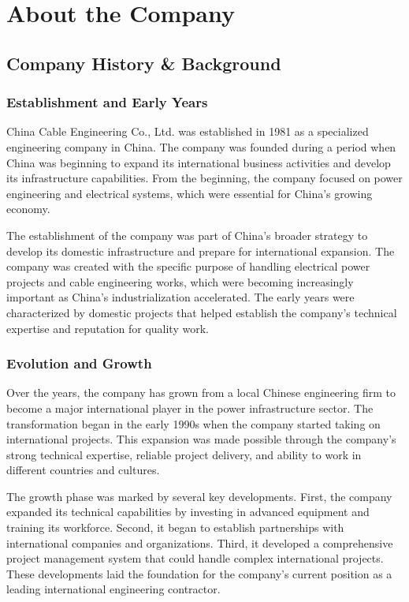 
\chapter{About the Company}

\section{Company History \& Background}

\subsection{Establishment and Early Years}
China Cable Engineering Co., Ltd. was established in 1981 as a specialized engineering company in China. The company was founded during a period when China was beginning to expand its international business activities and develop its infrastructure capabilities. From the beginning, the company focused on power engineering and electrical systems, which were essential for China's growing economy.

The establishment of the company was part of China's broader strategy to develop its domestic infrastructure and prepare for international expansion. The company was created with the specific purpose of handling electrical power projects and cable engineering works, which were becoming increasingly important as China's industrialization accelerated. The early years were characterized by domestic projects that helped establish the company's technical expertise and reputation for quality work.

\subsection{Evolution and Growth}
Over the years, the company has grown from a local Chinese engineering firm to become a major international player in the power infrastructure sector. The transformation began in the early 1990s when the company started taking on international projects. This expansion was made possible through the company's strong technical expertise, reliable project delivery, and ability to work in different countries and cultures.

The growth phase was marked by several key developments. First, the company expanded its technical capabilities by investing in advanced equipment and training its workforce. Second, it began to establish partnerships with international companies and organizations. Third, it developed a comprehensive project management system that could handle complex international projects. These developments laid the foundation for the company's current position as a leading international engineering contractor.

